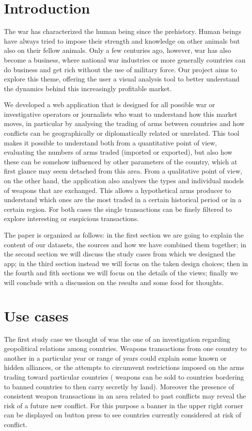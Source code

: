 \documentclass{article}
\begin{document}
\begin{multicols}{2}

\section*{Introduction}
%
The war has characterized the human being since the prehistory. Human beings have always tried to impose their strength and knowledge on other animals but also on their fellow animals. Only a few centuries ago, however, war has also become a business, where national war industries or more generally countries can do business and get rich without the use of military force. Our project aims to explore this theme, offering the user a visual analysis tool to better understand the dynamics behind this increasingly profitable market.

We developed a web application that is designed for all possible war or investigative operators or journalists who want to understand how this market moves, in particular by analysing the trading of arms between countries and how conflicts can be geographically or diplomatically related or unrelated. This tool makes it possible to understand both from a quantitative point of view, evaluating the numbers of arms traded (imported or exported), but also how these can be somehow influenced by other parameters of the country, which at first glance may seem detached from this area. 
From a qualitative point of view, on the other hand, the application also analyses the types and individual models of weapons that are exchanged. This allows a hypothetical arms producer to understand which ones are the most traded in a certain historical period or in a certain region. 
For both cases the single transactions can be finely filtered to explore interesting or suspicious transactions.

The paper is organized as follows: in the first section we are going to explain the content of our datasets, the sources and how we have combined them together; in the second section we will discuss the study cases from which we designed the app; in the third section instead we will focus on the taken design choices; then in the fourth and fith sections we will focus on the details of the views; finally we will conclude with a discussion on the results and some food for thoughts.

\section{Use cases}
The first study case we thought of was the one of an investigation regarding geopolitical relations among countries. Weapons transactions from one country to another in a particular year or range of years could explain some known or hidden alliances, or the attempts to circumvent restrictions imposed on the arms trading toward particular countries ( weapons can be sold to countries bordering to banned countries to then carry secretly by land).  Moreover the presence of consistent weapon transactions in an area related to past conflicts may reveal the risk of a future new conflict. For this purpose a banner in the upper right corner can be displayed on button press to see countries currently considered at risk of conflict.


\end{multicols}
\end{document}
